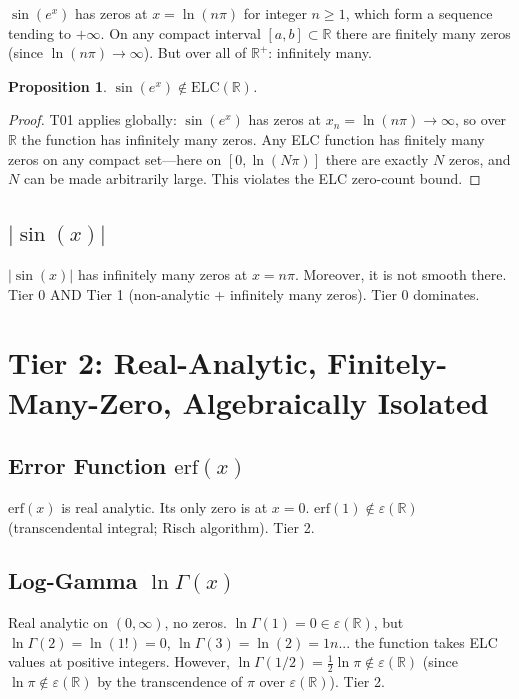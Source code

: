 \documentclass[11pt]{article}
\newtheorem{proposition}[theorem]{Proposition}
\begin{document}
$\sin(e^x)$ has zeros at $x=\ln(n\pi)$ for integer $n\geq1$, which form a sequence
tending to $+\infty$. On any compact interval $[a,b]\subset\mathbb{R}$ there are finitely many zeros
(since $\ln(n\pi)\to\infty$). But over all of $\mathbb{R}^+$: infinitely many.

\begin{proposition}
$\sin(e^x)\notin\mathrm{ELC}(\mathbb{R})$.
\end{proposition}

\begin{proof}
T01 applies globally: $\sin(e^x)$ has zeros at $x_n=\ln(n\pi)\to\infty$, so
over $\mathbb{R}$ the function has infinitely many zeros. Any ELC function has
finitely many zeros on any compact set---here on $[0,\ln(N\pi)]$ there are exactly
$N$ zeros, and $N$ can be made arbitrarily large. This violates the ELC zero-count bound.
\end{proof}

\subsection{$|\sin(x)|$}

$|\sin(x)|$ has infinitely many zeros at $x=n\pi$. Moreover, it is not smooth there.
Tier 0 AND Tier 1 (non-analytic + infinitely many zeros). Tier 0 dominates.

\section{Tier 2: Real-Analytic, Finitely-Many-Zero, Algebraically Isolated}

\subsection{Error Function $\mathrm{erf}(x)$}

$\mathrm{erf}(x)$ is real analytic. Its only zero is at $x=0$.
$\mathrm{erf}(1)\notin\varepsilon(\mathbb{R})$ (transcendental integral; Risch algorithm).
Tier 2.

\subsection{Log-Gamma $\ln\Gamma(x)$}

Real analytic on $(0,\infty)$, no zeros. $\ln\Gamma(1)=0\in\varepsilon(\mathbb{R})$,
but $\ln\Gamma(2)=\ln(1!)=0$, $\ln\Gamma(3)=\ln(2)=1n$... the function takes ELC values
at positive integers. However, $\ln\Gamma(1/2)=\tfrac12\ln\pi\notin\varepsilon(\mathbb{R})$
(since $\ln\pi\notin\varepsilon(\mathbb{R})$ by the transcendence of $\pi$ over $\varepsilon(\mathbb{R})$).
Tier 2.
\end{document}
